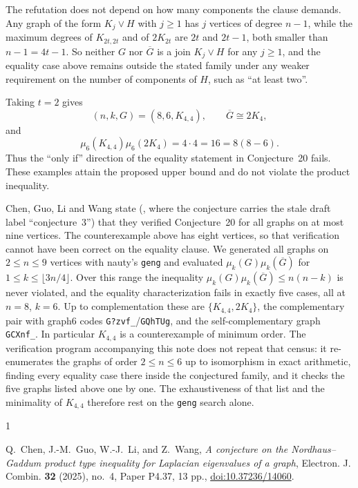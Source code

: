 \documentclass[11pt]{amsart}
\begin{document}
The refutation does not depend on how many components the clause demands. Any
graph of the form $K_j\vee H$ with $j\ge1$ has $j$ vertices of degree $n-1$,
while the maximum degrees of $K_{2t,2t}$ and of $2K_{2t}$ are $2t$ and $2t-1$,
both smaller than $n-1=4t-1$. So neither $G$ nor $\overline G$ is a join
$K_j\vee H$ for any $j\ge1$, and the equality case above remains outside the
stated family under any weaker requirement on the number of components of $H$,
such as ``at least two''.

Taking $t=2$ gives
\[
(n,k,G)=(8,6,K_{4,4}),\qquad \overline G\cong2K_4,
\]
and
\[
\mu_6(K_{4,4})\mu_6(2K_4)=4\cdot4=16=8(8-6).
\]
Thus the ``only if'' direction of the equality statement in
Conjecture~20 fails. These examples attain the proposed upper bound and do
not violate the product inequality.

Chen, Guo, Li and Wang state (\cite[Remark~1]{CGLW}, where the conjecture
carries the stale draft label ``conjecture~3'') that they verified
Conjecture~20 for all graphs on at most nine vertices. The counterexample
above has eight vertices, so that verification cannot have been correct on
the equality clause. We generated all graphs on $2\le n\le9$ vertices with
nauty's \texttt{geng} and evaluated $\mu_k(G)\mu_k(\overline G)$ for
$1\le k\le\lfloor3n/4\rfloor$. Over this range the inequality
$\mu_k(G)\mu_k(\overline G)\le n(n-k)$ is never violated, and the equality
characterization fails in exactly five cases, all at $n=8$, $k=6$. Up to complementation these are $\{K_{4,4},2K_4\}$, the
complementary pair with graph6 codes \texttt{G?zvf\_}/\texttt{GQhTUg}, and
the self-complementary graph \texttt{GCXnf\_}. In particular $K_{4,4}$ is a
counterexample of minimum order. The verification program accompanying this
note does not repeat that census: it re-enumerates the graphs of order
$2\le n\le6$ up to isomorphism in exact arithmetic, finding every equality case
there inside the conjectured family, and it checks the five graphs listed above
one by one. The exhaustiveness of that list and the minimality of $K_{4,4}$
therefore rest on the \texttt{geng} search alone.

\begin{thebibliography}{1}

Q.~Chen, J.-M.~Guo, W.-J.~Li, and Z.~Wang,
\emph{A conjecture on the Nordhaus--Gaddum product type inequality for
Laplacian eigenvalues of a graph},
Electron. J. Combin. \textbf{32} (2025), no.~4, Paper P4.37, 13 pp.,
\href{https://doi.org/10.37236/14060}{doi:10.37236/14060}.

\end{thebibliography}
\end{document}
